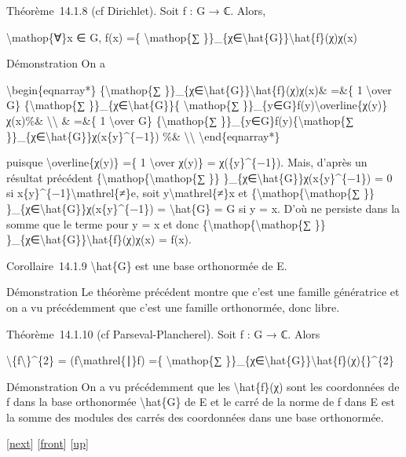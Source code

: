 \documentclass[]{article}
\begin{document}
Théorème~14.1.8 (cf Dirichlet). Soit f : G → ℂ. Alors,

\textbackslash{}mathop\{∀\}x ∈ G, f(x) =\{ \textbackslash{}mathop\{∑
\}\}\_\{χ∈\textbackslash{}hat\{G\}\}\textbackslash{}hat\{f\}(χ)χ(x)

Démonstration On a

\textbackslash{}begin\{eqnarray*\} \{\textbackslash{}mathop\{∑
\}\}\_\{χ∈\textbackslash{}hat\{G\}\}\textbackslash{}hat\{f\}(χ)χ(x)\&
=\&\{ 1 \textbackslash{}over \textbar{}G\textbar{}\}
\{\textbackslash{}mathop\{∑ \}\}\_\{χ∈\textbackslash{}hat\{G\}\}\{
\textbackslash{}mathop\{∑
\}\}\_\{y∈G\}f(y)\textbackslash{}overline\{χ(y)\}χ(x)\%\&
\textbackslash{}\textbackslash{} \& =\&\{ 1 \textbackslash{}over
\textbar{}G\textbar{}\} \{\textbackslash{}mathop\{∑
\}\}\_\{y∈G\}f(y)\{\textbackslash{}mathop\{∑
\}\}\_\{χ∈\textbackslash{}hat\{G\}\}χ(x\{y\}\^{}\{−1\}) \%\&
\textbackslash{}\textbackslash{} \textbackslash{}end\{eqnarray*\}

puisque \textbackslash{}overline\{χ(y)\} =\{ 1 \textbackslash{}over
χ(y)\} = χ(\{y\}\^{}\{−1\}). Mais, d'après un résultat précédent
\{\textbackslash{}mathop\{\textbackslash{}mathop\{∑ \}\}
\}\_\{χ∈\textbackslash{}hat\{G\}\}χ(x\{y\}\^{}\{−1\}) = 0 si
x\{y\}\^{}\{−1\}\textbackslash{}mathrel\{≠\}e, soit
y\textbackslash{}mathrel\{≠\}x et
\{\textbackslash{}mathop\{\textbackslash{}mathop\{∑ \}\}
\}\_\{χ∈\textbackslash{}hat\{G\}\}χ(x\{y\}\^{}\{−1\}) =
\textbar{}\textbackslash{}hat\{G\}\textbar{} = \textbar{}G\textbar{} si
y = x. D'où ne persiste dans la somme que le terme pour y = x et donc
\{\textbackslash{}mathop\{\textbackslash{}mathop\{∑ \}\}
\}\_\{χ∈\textbackslash{}hat\{G\}\}\textbackslash{}hat\{f\}(χ)χ(x) =
f(x).

Corollaire~14.1.9 \textbackslash{}hat\{G\} est une base orthonormée de
E.

Démonstration Le théorème précédent montre que c'est une famille
génératrice et on a vu précédemment que c'est une famille orthonormée,
donc libre.

Théorème~14.1.10 (cf Parseval-Plancherel). Soit f : G → ℂ. Alors

\textbackslash{}\textbar{}\{f\textbackslash{}\textbar{}\}\^{}\{2\} =
(f\textbackslash{}mathrel\{∣\}f) =\{ \textbackslash{}mathop\{∑
\}\}\_\{χ∈\textbackslash{}hat\{G\}\}\textbar{}\textbackslash{}hat\{f\}(χ)\{\textbar{}\}\^{}\{2\}

Démonstration On a vu précédemment que les \textbackslash{}hat\{f\}(χ)
sont les coordonnées de f dans la base orthonormée
\textbackslash{}hat\{G\} de E et le carré de la norme de f dans E est la
somme des modules des carrés des coordonnées dans une base orthonormée.

{[}\href{coursse78.html}{next}{]} {[}\href{coursse77.html}{front}{]}
{[}\href{coursch15.html\#coursse77.html}{up}{]}
\end{document}
